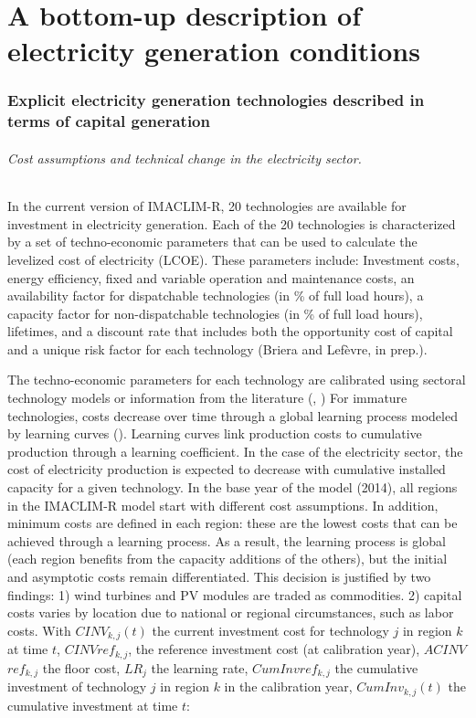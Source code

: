 \part*{A bottom-up description of electricity generation conditions}

\section{Explicit electricity generation technologies described in terms of capital generation}

\paragraph {Cost assumptions and technical change in the electricity sector.} In the current version of IMACLIM-R, 20 technologies are available for investment in electricity generation. Each of the 20 technologies is characterized by a set of techno-economic parameters that can be used to calculate the levelized cost of electricity (LCOE). These parameters include: Investment costs, energy efficiency, fixed and variable operation and maintenance costs, an availability factor for dispatchable technologies (in \% of full load hours), a capacity factor for non-dispatchable technologies (in \% of full load hours), lifetimes, and a discount rate that includes both the opportunity cost of capital and a unique risk factor for each technology (Briera and Lefèvre, in prep.).

The techno-economic parameters for each technology are calibrated using sectoral technology models or information from the literature (\cite{IEA2020}, \cite{IRENA2020})
For immature technologies, costs decrease over time through a global learning process modeled by learning curves (\cite{Neij2008}). Learning curves link production costs to cumulative production through a learning coefficient. In the case of the electricity sector, the cost of electricity production is expected to decrease with cumulative installed capacity for a given technology. In the base year of the model (2014), all regions in the IMACLIM-R model start with different cost assumptions. In addition, minimum costs are defined in each region: these are the lowest costs that can be achieved through a learning process. As a result, the learning process is global (each region benefits from the capacity additions of the others), but the initial and asymptotic costs remain differentiated. This decision is justified by two findings: 1) wind turbines and PV modules are traded as commodities. 2) capital costs varies by location due to national or regional circumstances, such as labor costs. With $CINV_{k,j}(t)$ the current investment cost for technology $j$ in region $k$ at time $t$, $CINV$\textunderscore $ref_{k,j}$, the reference investment cost (at calibration year), $A$\textunderscore$CINV$\textunderscore$ref_{k,j}$ the floor cost, $LR_{j}$ the learning rate, $Cum$\textunderscore$Inv$\textunderscore$ref_{k,j}$ the cumulative investment of technology $j$ in region $k$ in the calibration year, $Cum$\textunderscore $Inv_{k,j}(t)$ the cumulative investment at time $t$:

